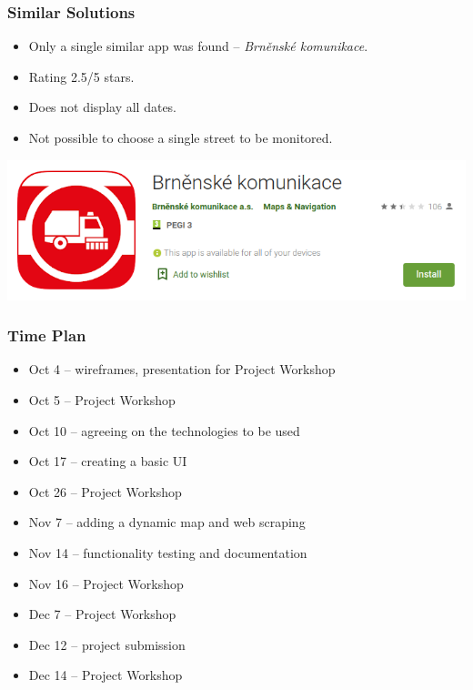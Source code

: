 \documentclass[10pt,xcolor=pdflatex,hyperref={unicode}]{beamer}
\begin{document}
\begin{frame}\frametitle{Similar Solutions}
    \doublespacing
    \begin{itemize}
        \item Only a single similar app was found -- \emph{Brněnské komunikace}.
        \item Rating 2.5/5 stars.
        \item Does not display all dates.
        \item Not possible to choose a single street to be monitored.
    \end{itemize}
    \vspace{0.25cm}
    
    \begin{center}
        \includegraphics[width=0.75\paperwidth]{img/block-cleaning-4.png}
    \end{center}
\end{frame}


\begin{frame}\frametitle{Time Plan}
    \begin{itemize}
        \item[] \alert{Oct 4} -- wireframes, presentation for Project Workshop
        \item[] \alert{Oct 5} -- Project Workshop
        \item[] \alert{Oct 10} -- agreeing on the technologies to be used
        \item[] \alert{Oct 17} -- creating a basic UI
        \item[] \alert{Oct 26} -- Project Workshop
        \item[] \alert{Nov 7}  -- adding a dynamic map and web scraping
        \item[] \alert{Nov 14} -- functionality testing and documentation
        \item[] \alert{Nov 16} -- Project Workshop
        \item[] \alert{Dec 7}  -- Project Workshop
        \item[] \alert{Dec 12} -- project submission
        \item[] \alert{Dec 14} -- Project Workshop
    \end{itemize}
\end{frame}


\end{document}
